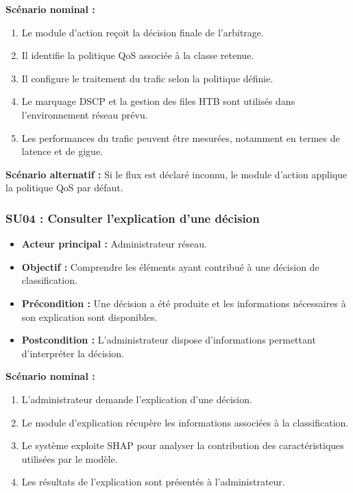 \textbf{Scénario nominal :}
\begin{enumerate}
    \item Le module d'action reçoit la décision finale
    de l'arbitrage.
    \item Il identifie la politique QoS associée à la classe
    retenue.
    \item Il configure le traitement du trafic selon
    la politique définie.
    \item Le marquage DSCP et la gestion des files HTB
    sont utilisés dans l'environnement réseau prévu.
    \item Les performances du trafic peuvent être mesurées,
    notamment en termes de latence et de gigue.
\end{enumerate}

\textbf{Scénario alternatif :}
Si le flux est déclaré inconnu, le module d'action
applique la politique QoS par défaut.


\subsubsection{SU04 : Consulter l'explication d'une décision}

\begin{itemize}
    \item \textbf{Acteur principal :} Administrateur réseau.
    \item \textbf{Objectif :} Comprendre les éléments ayant
    contribué à une décision de classification.
    \item \textbf{Précondition :} Une décision a été produite
    et les informations nécessaires à son explication
    sont disponibles.
    \item \textbf{Postcondition :} L'administrateur dispose
    d'informations permettant d'interpréter la décision.
\end{itemize}

\textbf{Scénario nominal :}
\begin{enumerate}
    \item L'administrateur demande l'explication
    d'une décision.
    \item Le module d'explication récupère les informations
    associées à la classification.
    \item Le système exploite SHAP pour analyser
    la contribution des caractéristiques utilisées
    par le modèle.
    \item Les résultats de l'explication sont présentés
    à l'administrateur.
\end{enumerate}


